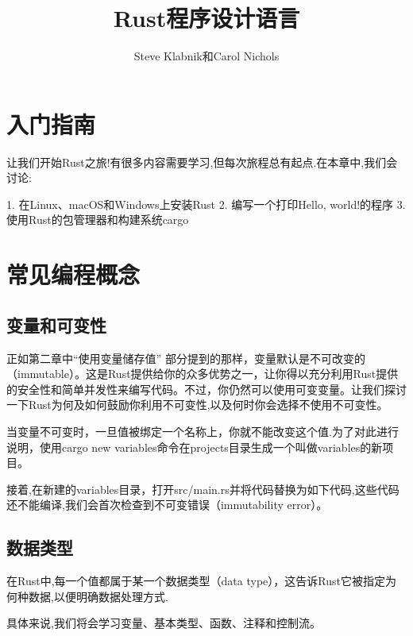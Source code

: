\documentclass[]{article}
\title{Rust程序设计语言}
\author{Steve Klabnik和Carol Nichols}
\begin{document}
\maketitle

\section{入门指南}
	让我们开始Rust之旅!有很多内容需要学习,但每次旅程总有起点.在本章中,我们会讨论:
	
	1. 在Linux、macOS和Windows上安装Rust
	2. 编写一个打印Hello, world!的程序
	3. 使用Rust的包管理器和构建系统cargo
\section{常见编程概念}
	\subsection{变量和可变性}
	正如第二章中“使用变量储存值” 部分提到的那样，变量默认是不可改变的（immutable）。这是Rust提供给你的众多优势之一，让你得以充分利用Rust提供的安全性和简单并发性来编写代码。不过，你仍然可以使用可变变量。让我们探讨一下Rust为何及如何鼓励你利用不可变性,以及何时你会选择不使用不可变性。
	
	当变量不可变时，一旦值被绑定一个名称上，你就不能改变这个值.为了对此进行说明，使用cargo new variables命令在projects目录生成一个叫做variables的新项目。

	接着,在新建的variables目录，打开src/main.rs并将代码替换为如下代码,这些代码还不能编译,我们会首次检查到不可变错误（immutability error）。

	\subsection{数据类型}
	在Rust中,每一个值都属于某一个数据类型（data type），这告诉Rust它被指定为何种数据,以便明确数据处理方式.
	
具体来说,我们将会学习变量、基本类型、函数、注释和控制流。
\end{document}

